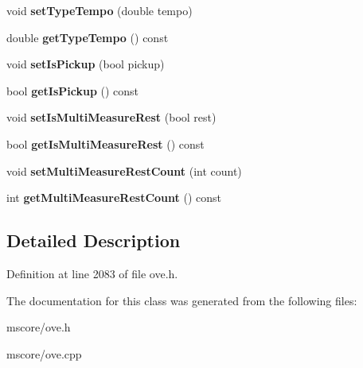 \begin{DoxyCompactItemize}
\mbox{\label{class_o_v_e_1_1_measure_a8b5aaf847f5b78e4d53de0b52f21e4dd}} 
void {\bfseries set\+Type\+Tempo} (double tempo)
\item 
\mbox{\label{class_o_v_e_1_1_measure_ac9c337add8e66f5cd2e0f7e7767ccdd8}} 
double {\bfseries get\+Type\+Tempo} () const
\item 
\mbox{\label{class_o_v_e_1_1_measure_adc791b56ab936f169b80d7f378c42a5b}} 
void {\bfseries set\+Is\+Pickup} (bool pickup)
\item 
\mbox{\label{class_o_v_e_1_1_measure_a0950209fb9fbed8f411c4fcd66b285ce}} 
bool {\bfseries get\+Is\+Pickup} () const
\item 
\mbox{\label{class_o_v_e_1_1_measure_ae520b73e152e6b3e27750788b40ca4c7}} 
void {\bfseries set\+Is\+Multi\+Measure\+Rest} (bool rest)
\item 
\mbox{\label{class_o_v_e_1_1_measure_a2e2da061a43994d89d892af62365dee4}} 
bool {\bfseries get\+Is\+Multi\+Measure\+Rest} () const
\item 
\mbox{\label{class_o_v_e_1_1_measure_a447ef91b11db44ee3dbcefe9d53f1971}} 
void {\bfseries set\+Multi\+Measure\+Rest\+Count} (int count)
\item 
\mbox{\label{class_o_v_e_1_1_measure_afc4162e1a9aed97671fb60724edfead0}} 
int {\bfseries get\+Multi\+Measure\+Rest\+Count} () const
\end{DoxyCompactItemize}


\subsection{Detailed Description}


Definition at line 2083 of file ove.\+h.



The documentation for this class was generated from the following files\+:\begin{DoxyCompactItemize}
\item 
mscore/ove.\+h\item 
mscore/ove.\+cpp\end{DoxyCompactItemize}
